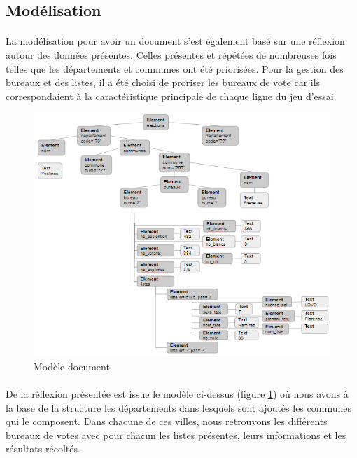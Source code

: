 \subsection{Modélisation}
\paragraph{}La modélisation pour avoir un document s'est également basé sur une réflexion autour des données présentes. Celles présentes et répétées de nombreuses fois telles que les départements et communes ont été priorisées. Pour la gestion des bureaux et des listes, il a été choisi de proriser les bureaux de vote car ils correspondaient à la caractéristique principale de chaque ligne du jeu d'essai.

\begin{figure}[!htp]
  \centering
  \includegraphics[width=\textwidth]{./src_img/structure_document.png}
  \caption{Modèle document}
  \label{fig:model_doc}
\end{figure}

\paragraph{}De la réflexion présentée est issue le modèle ci-dessus (figure \ref{fig:model_doc}) où nous avons à la base de la structure les départements dans lesquels sont ajoutés les communes qui le composent. Dans chacune de ces villes, nous retrouvons les différents bureaux de votes avec pour chacun les listes présentes, leurs informations et les résultats récoltés.

